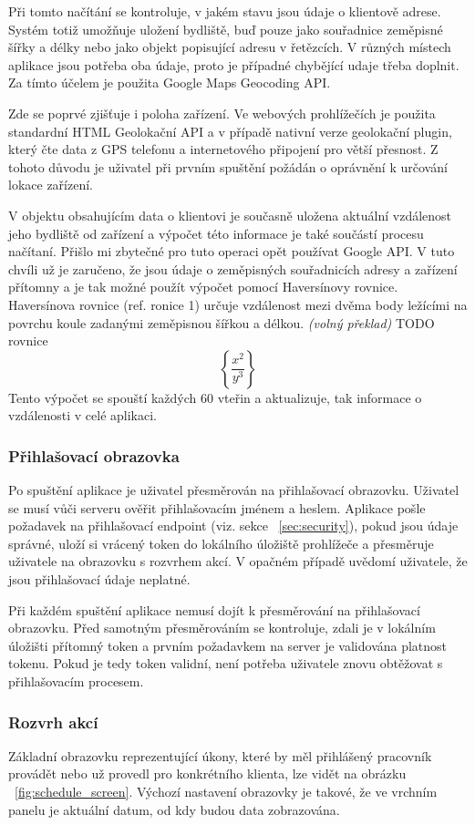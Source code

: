 \documentclass[
  biblatex,
  glossaries,
  index
]{kidiplom}
\begin{document}
Při tomto načítání se kontroluje, v jakém stavu jsou údaje o klientově adrese. Systém totiž umožňuje uložení bydliště, buď pouze jako souřadnice zeměpisné šířky a délky nebo jako objekt popisující adresu v řetězcích. V různých místech aplikace jsou potřeba oba údaje, proto je případné chybějící udaje třeba doplnit. Za tímto účelem je použita Google Maps Geocoding API. 

Zde se poprvé zjišťuje i poloha zařízení. Ve webových prohlížečích je použita standardní HTML Geolokační API a v případě nativní verze geolokační plugin, který čte data z GPS telefonu a internetového připojení pro větší přesnost. Z tohoto důvodu je uživatel při prvním spuštění požádán o oprávnění k určování lokace zařízení.

V objektu obsahujícím data o klientovi je současně uložena aktuální vzdálenost jeho bydliště od zařízení a výpočet této informace je také součástí procesu načítaní. Přišlo mi zbytečné pro tuto operaci opět používat Google API. V tuto chvíli už je zaručeno, že jsou údaje o zeměpisných souřadnicích adresy a zařízení přítomny a je tak možné použít výpočet pomocí Haversínovy rovnice. Haversínova rovnice (ref. ronice 1) určuje vzdálenost mezi dvěma body ležícími na povrchu koule zadanými zeměpisnou šířkou a délkou.\cite{13} \textit{(volný překlad)} TODO rovnice
$$\left\{\frac{x^2}{y^3}\right\}$$
 Tento výpočet se spouští každých 60 vteřin a aktualizuje, tak informace o vzdálenosti v celé aplikaci.

\subsubsection{Přihlašovací obrazovka}
Po spuštění aplikace je uživatel přesměrován na přihlašovací obrazovku. Uživatel se musí  vůči serveru ověřit přihlašovacím jménem a heslem. Aplikace pošle požadavek na přihlašovací endpoint (viz. sekce ~\ref{sec:security}), pokud jsou údaje správné, uloží si vrácený token do lokálního úložiště prohlížeče a přesměruje uživatele na obrazovku s rozvrhem akcí. V opačném případě uvědomí uživatele, že jsou přihlašovací údaje neplatné.
  
Při každém spuštění aplikace nemusí dojít k přesměrování na přihlašovací obrazovku. Před samotným přesměrováním se kontroluje, zdali je v lokálním úložišti přítomný token a prvním požadavkem na server je validována platnost tokenu. Pokud je tedy token validní, není potřeba uživatele znovu obtěžovat s přihlašovacím procesem.

\subsubsection{Rozvrh akcí}
\label{sec:schedule}
Základní obrazovku reprezentující úkony, které by měl přihlášený pracovník provádět nebo už provedl pro konkrétního klienta, lze vidět na obrázku ~\ref{fig:schedule_screen}. Výchozí nastavení obrazovky je takové, že ve vrchním panelu je aktuální datum, od kdy budou data zobrazována. 
\end{document}
